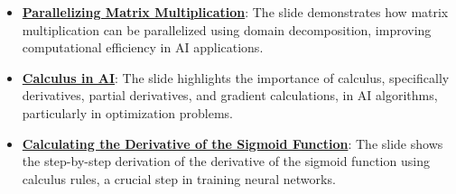 \documentclass{article}%
\begin{document}
\begin{itemize}[leftmargin=*]
\item \href{https://purdue.brightspace.com/d2l/common/assets/pdfjs-d2l-dist/1.0.14-legacy/web/viewer.html?file=%2Fcontent%2Fenforced%2F1095467-wl.202510.CS.24300.001%2F04L1-Linear Algebra Primer.pdf%3Fou%3D1095467&lang=en-us&container=d2l-fileviewer-rendered-pdf&fullscreen=d2l-fileviewer-rendered-pdf-dialog&height=667#page=18}{\textbf{Parallelizing Matrix Multiplication}}: The slide demonstrates how matrix multiplication can be parallelized using domain decomposition, improving computational efficiency in AI applications.%
\item \href{https://purdue.brightspace.com/d2l/common/assets/pdfjs-d2l-dist/1.0.14-legacy/web/viewer.html?file=%2Fcontent%2Fenforced%2F1095467-wl.202510.CS.24300.001%2F04L1-Linear Algebra Primer.pdf%3Fou%3D1095467&lang=en-us&container=d2l-fileviewer-rendered-pdf&fullscreen=d2l-fileviewer-rendered-pdf-dialog&height=667#page=19}{\textbf{Calculus in AI}}: The slide highlights the importance of calculus, specifically derivatives, partial derivatives, and gradient calculations, in AI algorithms, particularly in optimization problems.%
\item \href{https://purdue.brightspace.com/d2l/common/assets/pdfjs-d2l-dist/1.0.14-legacy/web/viewer.html?file=%2Fcontent%2Fenforced%2F1095467-wl.202510.CS.24300.001%2F04L1-Linear Algebra Primer.pdf%3Fou%3D1095467&lang=en-us&container=d2l-fileviewer-rendered-pdf&fullscreen=d2l-fileviewer-rendered-pdf-dialog&height=667#page=21}{\textbf{Calculating the Derivative of the Sigmoid Function}}: The slide shows the step-by-step derivation of the derivative of the sigmoid function using calculus rules, a crucial step in training neural networks.%
\end{itemize}%
\end{document}
